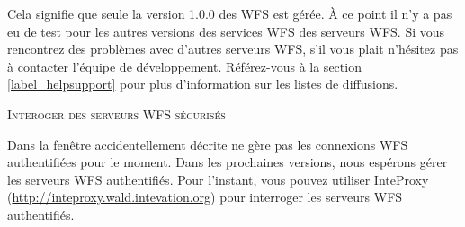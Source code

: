 Cela signifie que seule la version 1.0.0 des WFS est gérée. À ce point il n'y a pas eu de test pour les autres versions des services WFS des serveurs WFS.
Si vous rencontrez des problèmes avec d'autres serveurs WFS, s'il vous plait n'hésitez  pas à contacter l'équipe de développement. Référez-vous à la section  \ref{label_helpsupport} pour plus d'information sur les listes de diffusions.


\begin{Tip}[htb]\caption{\textsc{Interoger des serveurs WFS sécurisés}}
Dans la fenêtre  accidentellement décrite \qg ne gère pas les connexions WFS authentifiées pour le moment. Dans les prochaines versions, nous espérons gérer les serveurs WFS authentifiés. Pour l'instant, vous pouvez utiliser  InteProxy (\url{http://inteproxy.wald.intevation.org}) pour interroger les serveurs WFS authentifiés.
\end{Tip} 
